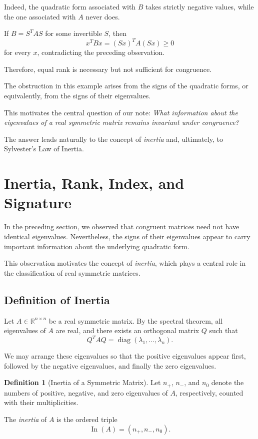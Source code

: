 \documentclass[11pt]{article}
\theoremstyle{definition}
\newtheorem{definition}[theorem]{Definition}
\theoremstyle{remark}
\begin{document}
Indeed, the quadratic form associated with $B$
takes strictly negative values, while the one
associated with $A$ never does.

If $B=S^TAS$ for some invertible $S$, then
\[
    x^TBx=(Sx)^TA(Sx)\geq 0
\]
for every $x$, contradicting the preceding
observation.

Therefore, equal rank is necessary but not
sufficient for congruence.

The obstruction in this example arises from
the signs of the quadratic forms, or equivalently,
from the signs of their eigenvalues.

This motivates the central question of our note:
\emph{What information about the eigenvalues
of a real symmetric matrix remains invariant
under congruence?}

The answer leads naturally to the concept of
\emph{inertia} and, ultimately, to Sylvester's
Law of Inertia.

\section{Inertia, Rank, Index, and Signature}

In the preceding section, we observed that congruent
matrices need not have identical eigenvalues. Nevertheless,
the signs of their eigenvalues appear to carry important
information about the underlying quadratic form.

This observation motivates the concept of \emph{inertia},
which plays a central role in the classification of real
symmetric matrices.

\subsection{Definition of Inertia}

Let $A\in\mathbb{R}^{n\times n}$ be a real symmetric
matrix. By the spectral theorem, all eigenvalues of $A$
are real, and there exists an orthogonal matrix $Q$
such that
\[
    Q^TAQ=
    \operatorname{diag}(\lambda_1,\ldots,\lambda_n).
\]

We may arrange these eigenvalues so that the positive
eigenvalues appear first, followed by the negative
eigenvalues, and finally the zero eigenvalues.

\begin{definition}[Inertia of a Symmetric Matrix]
Let $n_+$, $n_-$, and $n_0$ denote the numbers of
positive, negative, and zero eigenvalues of $A$,
respectively, counted with their multiplicities.

The \emph{inertia} of $A$ is the ordered triple
\[
    \boxed{\operatorname{In}(A)=(n_+,n_-,n_0)}.
\]
\end{definition}
\end{document}
